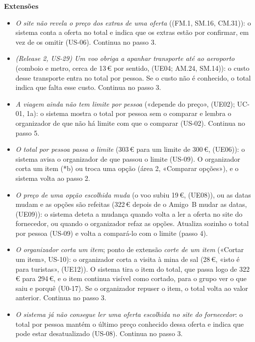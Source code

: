 \documentclass[11pt,a4paper]{article}
\newcommand{\reg}[1]{{\footnotesize\textcolor{pendente}{(#1)}}}
\newenvironment{usecase}[2]{%
  \par\medskip\noindent{\large\bfseries\color{roamly}#1: #2}\par\smallskip\small\noindent\ignorespaces}{\par\medskip}
\begin{document}
\begin{usecase}{UC-02}{Saber o total real por pessoa}
\textbf{Extensões}
\begin{itemize}[leftmargin=2.2em]
  \item[2a.] \textit{O site não revela o preço dos extras de uma oferta} (\reg{FM.1, SM.16, CM.31}): o sistema conta a oferta no total e indica que os extras estão por confirmar, em vez de os omitir (US-06). Continua no passo 3.
  \item[2b.] \textit{(Release 2, US-29) Um voo obriga a apanhar transporte até ao aeroporto} (comboio e metro, cerca de 13\,€ por sentido, \reg{UE04; AM.24, SM.14}): o custo desse transporte entra no total por pessoa. Se o custo não é conhecido, o total indica que falta esse custo. Continua no passo 3.
  \item[4a.] \textit{A viagem ainda não tem limite por pessoa} («depende do preço», \reg{UE02}; UC-01, 1a): o sistema mostra o total por pessoa sem o comparar e lembra o organizador de que não há limite com que o comparar (US-02). Continua no passo 5.
  \item[4b.] \textit{O total por pessoa passa o limite} (303\,€ para um limite de 300\,€, \reg{UE06}): o sistema avisa o organizador de que passou o limite (US-09). O organizador corta um item (*b) ou troca uma opção (área 2, «Comparar opções»), e o sistema volta ao passo 2.
  \item[*a.] \textit{O preço de uma opção escolhida muda} (o voo subiu 19\,€, \reg{UE08}), ou as datas mudam e as opções são refeitas (322\,€ depois de o Amigo~B mudar as datas, \reg{UE09}): o sistema deteta a mudança quando volta a ler a oferta no site do fornecedor, ou quando o organizador refaz as opções. Atualiza sozinho o total por pessoa (US-09) e volta a compará-lo com o limite (passo 4).
  \item[*b.] \textit{O organizador corta um item}; ponto de extensão \textit{corte de um item} («Cortar um item», US-10): o organizador corta a visita à mina de sal (28\,€, «isto é para turistas», \reg{UE12}). O sistema tira o item do total, que passa logo de 322\,€ para 294\,€, e o item continua visível como cortado, para o grupo ver o que saiu e porquê \reg{U0-17}. Se o organizador repuser o item, o total volta ao valor anterior. Continua no passo 3.
  \item[*c.] \textit{O sistema já não consegue ler uma oferta escolhida no site do fornecedor}: o total por pessoa mantém o último preço conhecido dessa oferta e indica que pode estar desatualizado (US-08). Continua no passo 3.
\end{itemize}


\end{usecase}
\end{document}
